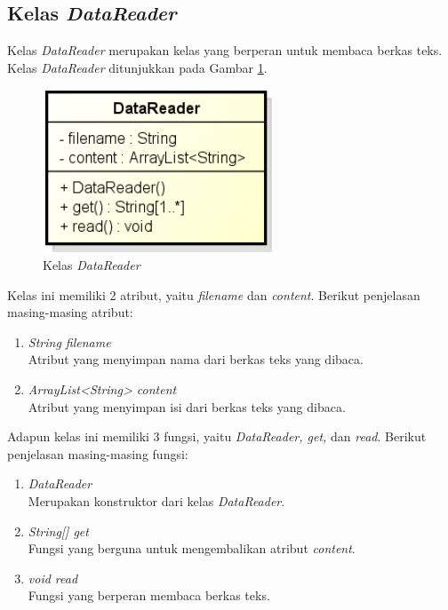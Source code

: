 \subsection{Kelas \textit{DataReader}}

Kelas \textit{DataReader} merupakan kelas yang berperan untuk membaca berkas teks. Kelas \textit{DataReader} ditunjukkan pada Gambar \ref{fig:classdatareader}.

\begin{figure}[H]
	\centering
	\includegraphics[scale=0.8]{Gambar/class_data_reader}
	\caption{Kelas \textit{DataReader}}\label{fig:classdatareader}
\end{figure}

Kelas ini memiliki 2 atribut, yaitu \textit{filename} dan \textit{content}. Berikut penjelasan masing-masing atribut:

\begin{enumerate}
	\item \textit{String filename} \\
	Atribut yang menyimpan nama dari berkas teks yang dibaca.
	\item \textit{ArrayList<String> content} \\
	Atribut yang menyimpan isi dari berkas teks yang dibaca.
\end{enumerate}

Adapun kelas ini memiliki 3 fungsi, yaitu \textit{DataReader, get,} dan \textit{read}. Berikut penjelasan masing-masing fungsi:

\begin{enumerate}
	\item \textit{DataReader} \\
	Merupakan konstruktor dari kelas \textit{DataReader}.
	\item \textit{String[] get} \\
	Fungsi yang berguna untuk mengembalikan atribut \textit{content}.
	\item \textit{void read} \\
	Fungsi yang berperan membaca berkas teks.
\end{enumerate}

